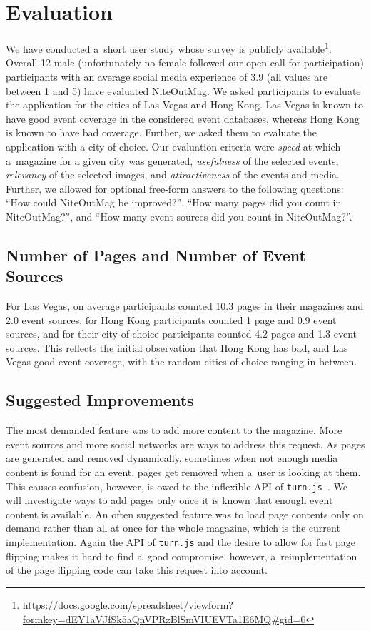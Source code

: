 \documentclass[runningheads,a4paper]{llncs}
\begin{document}
{\section{Evaluation}
We have conducted a~short user study whose survey is publicly
available\footnote{\url{https://docs.google.com/spreadsheet/viewform?formkey=dEY1aVJfSk5aQnVPRzBlSmVIUEVTa1E6MQ\#gid=0}}.
Overall 12 male (unfortunately no female followed our open call for participation) participants with an average social media experience of 3.9
(all values are between 1 and 5) have evaluated NiteOutMag.
We asked participants to evaluate the application for the cities of Las Vegas and Hong Kong.
Las Vegas is known to have good event coverage in the considered event databases,
whereas Hong Kong is known to have bad coverage.
Further, we asked them to evaluate the application with a city of choice.
Our evaluation criteria were
\emph{speed} at which a~magazine for a given city was generated,
\emph{usefulness} of the selected events,
\emph{relevancy} of the selected images, and
\emph{attractiveness} of the events and media.
Further, we allowed for optional free-form answers to the following questions: 
``How could NiteOutMag be improved?'', ``How many pages did you count in NiteOutMag?'', and
``How many event sources did you count in NiteOutMag?''.

\subsection{Number of Pages and Number of Event Sources}
For Las Vegas, on average participants counted 10.3 pages in their magazines and 2.0 event sources,
for Hong Kong participants counted 1 page and 0.9 event sources,
and for their city of choice participants counted 4.2 pages and 1.3 event sources.
This reflects the initial observation that Hong Kong has bad, and Las Vegas good event coverage, with the random cities of choice ranging in between.

\subsection{Suggested Improvements}
The most demanded feature was to add more content to the magazine.
More event sources and more social networks are ways to address this request.
As pages are generated and removed dynamically,
sometimes when not enough media content is found for an event,
pages get removed when a~user is looking at them.
This causes confusion, however, is owed to the inflexible API of \texttt{turn.js}~\cite{TurnJs2012}.
We will investigate ways to add pages
only once it is known that enough event content is available.
An often suggested feature was to load page contents only on demand
rather than all at once for the whole magazine,
which is the current implementation.
Again the API of \texttt{turn.js}
and the desire to allow for fast page flipping makes it hard to find a~good compromise,
however, a~reimplementation of the page flipping code can take this request into account.


}
\end{document}
